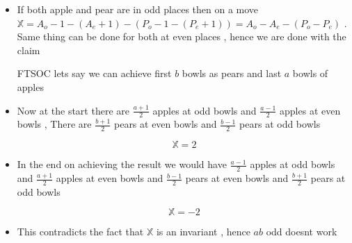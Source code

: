 \begin{itemize}
\item If both apple and pear are in odd places then on a move $\mathbb{X} = A_o - 1 - (A_e+1) - (P_o-1 - (P_e+1)) = A_o - A_e - ( P_o - P_e)$ . Same thing can be done for both at even places ,  hence we are done with the claim 

FTSOC lets say we can achieve first $b$ bowls as pears and last $a$ bowls of apples 


\item  Now at the start there are $\frac{a+1}{2}$ apples at odd bowls  and $\frac{a-1}{2}$ apples at even bowls , There are  $\frac{b+1}{2}$ pears at even  bowls  and $\frac{b-1}{2}$ pears at odd bowls

\[ \mathbb{X} = 2 \]

\item In the end on achieving the result we would have  $\frac{a-1}{2}$ apples at odd bowls  and $\frac{a+1}{2}$ apples at even bowls and   $\frac{b-1}{2}$ pears at even  bowls  and $\frac{b+1}{2}$ pears at odd bowls

\[ \mathbb{X} = -2\]

\item This contradicts the fact that $\mathbb{X}$ is an invariant , hence $ab$ odd doesnt work 
\end{itemize}
